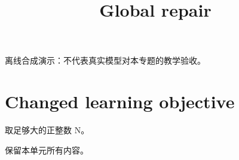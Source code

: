 \documentclass[UTF8,fontset=fandol,11pt]{ctexart}
\title{Global repair}
\date{}
\begin{document}
\maketitle
\par\noindent 离线合成演示：不代表真实模型对本专题的教学验收。\par
\section{Changed learning objective}\label{sec:S01}
取足够大的正整数 N。\par
保留本单元所有内容。\par
\end{document}
